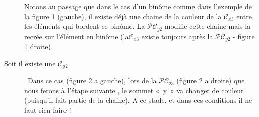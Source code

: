 \documentclass[french]{report}
\begin{document}
\begin{adjustwidth}{3.5em}{0pt}
\begin{description}
Notons au passage que dans le cas d'un binôme comme dans l'exemple de la figure \ref{fig:cas4_etape2_bionome} (gauche), il existe déjà une chaine de la couleur de la $\overline{\mathcal{C}}_{x3}$ entre les éléments qui bordent ce binôme. La $\mathcal{PC}_{y2}$ modifie cette chaine mais la recrée sur l’élément en binôme (la$\overline{\mathcal{C}}_{x3}$ existe toujours après la $\mathcal{PC}_{y2}$ - figure \ref{fig:cas4_etape2_bionome} droite).
\begin{figure}[!ht]\centering
	\begin{changemargin}{0cm}{-3cm}
		\begin{center}
			
			\hspace{15pt}
			
		\end{center}
	\end{changemargin}
	\begin{changemargin}{3cm}{0cm}
	\caption{}\label{fig:cas4_etape2_bionome}
	\end{changemargin}
\end{figure}	
\FloatBarrier

		\item[Soit il existe une $\overline{\mathcal{C}}_{y2}$.]\
Dans ce cas (figure \ref{fig:cas4_etape2_rien} a gauche), lors de la $\mathcal{PC}_{23}$ (figure \ref{fig:cas4_etape2_rien} a droite) que nous ferons à l’étape suivante , le sommet «~y~» va changer de couleur (puisqu’il fait partie de la chaine). A ce stade, et dans ces conditions il ne faut rien faire !
\begin{figure}[!ht]\centering
	\begin{changemargin}{0cm}{-3cm}
		\begin{center}
			
			\hspace{15pt}
			
		\end{center}
	\end{changemargin}
	\begin{changemargin}{3cm}{0cm}
	\caption{}\label{fig:cas4_etape2_rien}
	\end{changemargin}
\end{figure}	
\FloatBarrier

	\end{description}
\end{adjustwidth}
\end{document}
